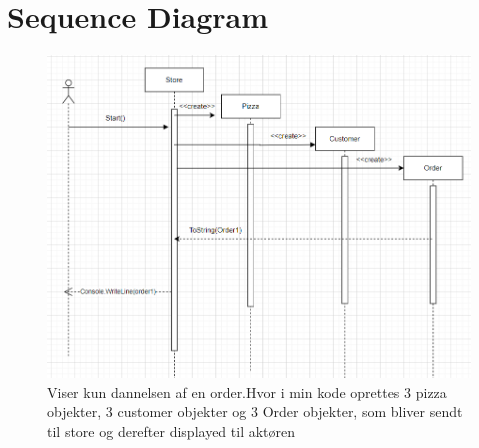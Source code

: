 \section{Sequence Diagram}

\begin{figure}[htbp]
    \center
    \includegraphics[scale=0.8]{img/UML1Sekvensdia.PNG}
    \caption{Viser kun dannelsen af en order.Hvor i min kode oprettes 3 pizza objekter, 3 customer objekter og 3 Order objekter, som bliver sendt til store og derefter displayed til aktøren }
\end{figure}

